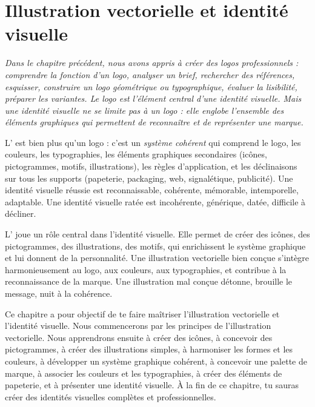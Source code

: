 
\chapter{Illustration vectorielle et identité visuelle}

\noindent
\textit{Dans le chapitre précédent, nous avons appris à créer des logos professionnels : comprendre la fonction d'un logo, analyser un brief, rechercher des références, esquisser, construire un logo géométrique ou typographique, évaluer la lisibilité, préparer les variantes. Le logo est l'élément central d'une identité visuelle. Mais une identité visuelle ne se limite pas à un logo : elle englobe l'ensemble des éléments graphiques qui permettent de reconnaître et de représenter une marque.}

\vspace{1em}

\noindent
L' est bien plus qu'un logo : c'est un \emph{système cohérent} qui comprend le logo, les couleurs, les typographies, les éléments graphiques secondaires (icônes, pictogrammes, motifs, illustrations), les règles d'application, et les déclinaisons sur tous les supports (papeterie, packaging, web, signalétique, publicité). Une identité visuelle réussie est reconnaissable, cohérente, mémorable, intemporelle, adaptable. Une identité visuelle ratée est incohérente, générique, datée, difficile à décliner.

\vspace{1em}

\noindent
L' joue un rôle central dans l'identité visuelle. Elle permet de créer des icônes, des pictogrammes, des illustrations, des motifs, qui enrichissent le système graphique et lui donnent de la personnalité. Une illustration vectorielle bien conçue s'intègre harmonieusement au logo, aux couleurs, aux typographies, et contribue à la reconnaissance de la marque. Une illustration mal conçue détonne, brouille le message, nuit à la cohérence.

\vspace{1em}

\noindent
Ce chapitre a pour objectif de te faire maîtriser l'illustration vectorielle et l'identité visuelle. Nous commencerons par les principes de l'illustration vectorielle. Nous apprendrons ensuite à créer des icônes, à concevoir des pictogrammes, à créer des illustrations simples, à harmoniser les formes et les couleurs, à développer un système graphique cohérent, à concevoir une palette de marque, à associer les couleurs et les typographies, à créer des éléments de papeterie, et à présenter une identité visuelle. À la fin de ce chapitre, tu sauras créer des identités visuelles complètes et professionnelles.

